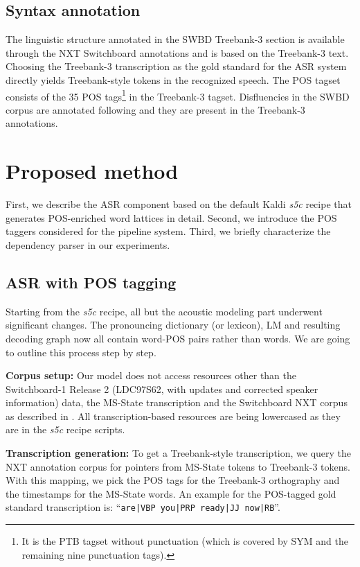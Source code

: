 \documentclass[11pt,letterpaper]{article}
\begin{document}
\subsection{Syntax annotation}\label{ssec:syn}
The linguistic structure annotated in the SWBD Treebank-3 section is available through the NXT Switchboard annotations and is based on the Treebank-3 text. Choosing the Treebank-3 transcription as the gold standard for the ASR system directly yields Treebank-style tokens in the recognized speech. The POS tagset  \citep[p.~394]{CalhounEtal:2010} consists of the 35 POS tags\footnote{It is the PTB tagset without punctuation (which is covered by SYM and the remaining nine punctuation tags).} in the Treebank-3 tagset. Disfluencies in the SWBD corpus are annotated following \citet{Shriberg:1994} and they are present in the Treebank-3 annotations.

\section{Proposed method}\label{sec:prop}
First, we describe the ASR component based on the default Kaldi \emph{s5c} recipe that generates POS-enriched word lattices in detail. Second, we introduce the POS taggers considered for the pipeline system. Third, we briefly characterize the dependency parser in our experiments.

\subsection{ASR with POS tagging}\label{ssec:asr}
Starting from the \emph{s5c} recipe, all but the acoustic modeling part underwent significant changes. The pronouncing dictionary (or lexicon), LM and resulting decoding graph now all contain word-POS pairs rather than words. We are going to outline this process step by step.

\textbf{Corpus setup:} Our model does not access resources other than the Switchboard-1 Release 2 (LDC97S62, with updates and corrected speaker information) data, the MS-State transcription and the Switchboard NXT corpus as described in . All transcription-based resources are being lowercased as they are in the \emph{s5c} recipe scripts.

\textbf{Transcription generation:} To get a Treebank-style transcription, we query the NXT annotation corpus for pointers from MS-State tokens to Treebank-3 tokens. With this mapping, we pick the POS tags for the Treebank-3 orthography and the timestamps for the MS-State words. An example for the POS-tagged gold standard transcription is: ``\texttt{are|VBP you|PRP ready|JJ now|RB}''.
\end{document}
